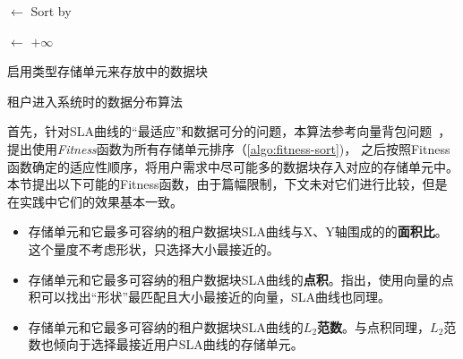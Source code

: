 \IncMargin{1em}
\begin{algorithm}[h]
  \SetAlgoLined
  \BlankLine

  \Suitable$\leftarrow$  \;%
  Sort \Suitable by \Fitness \; \label{algo:fitness-sort}


  
  \BestCost $\leftarrow$ $+\infty$


  启用\BestType 类型存储单元来存放\Request 中的数据块 \;

  \caption{租户进入系统时的数据分布算法}
  \label{algo:tenant-allocation}
\end{algorithm}
\DecMargin{1em}

首先，针对SLA曲线的“最适应”和数据可分的问题，本算法参考向量背包问题~\cite{panigrahy2011heuristics}，提出使用\textit{Fitness}函数为所有存储单元排序（\autoref{algo:fitness-sort})，
之后按照Fitness函数确定的适应性顺序，将用户需求中尽可能多的数据块存入对应的存储单元中。
本节提出以下可能的Fitness函数，由于篇幅限制，下文未对它们进行比较，但是在实践中它们的效果基本一致。

\begin{itemize}
  \item 存储单元和它最多可容纳的租户数据块SLA曲线与X、Y轴围成的的\textbf{面积比}。这个量度不考虑形状，只选择大小最接近的。
  \item 存储单元和它最多可容纳的租户数据块SLA曲线的\textbf{点积}。\citet{panigrahy2011heuristics,gabay2016vector}指出，使用向量的点积可以找出“形状”最匹配且大小最接近的向量，SLA曲线也同理。
  \item 存储单元和它最多可容纳的租户数据块SLA曲线的\textbf{$L_2$范数}。与点积同理，$L_2$范数也倾向于选择最接近用户SLA曲线的存储单元。
\end{itemize}

